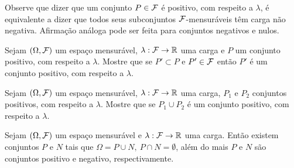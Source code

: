 Observe que dizer que um conjunto $P\in \mathcal{F}$ é positivo,
com respeito a $\lambda$, é  equivalente a dizer que 
todos seus subconjuntos $\mathcal{F}$-mensuráveis têm carga
não negativa. Afirmação análoga pode ser feita para 
conjuntos negativos e nulos.

\begin{exercicio}
	Sejam $(\Omega,\mathcal{F})$ um espaço mensurável, $\lambda:\mathcal{F}\to\mathbb{R}$
	uma carga e $P$ um conjunto positivo, com respeito a $\lambda$. 
	Mostre que se $P'\subset P$ e $P'\in \mathcal{F}$ então $P'$ é um 
	conjunto positivo, com respeito a $\lambda$.
\end{exercicio}



\begin{exercicio}
	Sejam $(\Omega,\mathcal{F})$ um espaço mensurável, $\lambda:\mathcal{F}\to\mathbb{R}$
	uma carga, $P_1$ e $P_2$ conjuntos positivos, 
	com respeito a $\lambda$. 
	Mostre que se $P_1\cup P_2$  é um 
	conjunto positivo, com respeito a $\lambda$.
\end{exercicio}




\begin{teorema}
\label{teo-dec-Hahn}
Sejam $(\Omega,\mathcal{F})$ um espaço mensurável e $\lambda:\mathcal{F}\to\mathbb{R}$
uma carga. Então existem conjuntos $P$ e $N$ tais que 
$\Omega = P\cup N,\  P\cap N=\emptyset$, além do mais 
$P$ e $N$ são conjuntos positivo e negativo, respectivamente.
\end{teorema}


